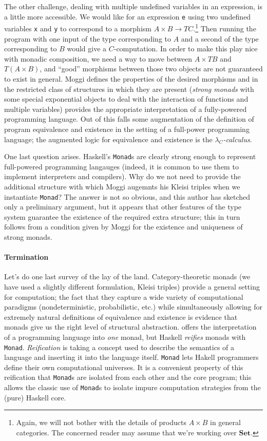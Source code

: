 \documentclass{article}
\renewcommand{\[}{\begin{eqnarray*}}
\renewcommand{\]}{\end{eqnarray*}}
\theoremstyle{definition}
\begin{document}
The other challenge, dealing with multiple undefined variables in an expression,
is a little more accessible. We would like for an expression \texttt{e} using
two undefined variables \texttt{x} and \texttt{y} to correspond to a morphism $A
\times B \rightarrow TC.$\footnote{Again, we will not bother with the details of
products $A \times B$ in general categories. The concerned reader may assume
that we're working over $\mathbf{Set}$.} Then running the program with one input
of the type corresponding to $A$ and a second of the type corresponding to $B$
would give a $C$-computation. In order to make this play nice with monadic
composition, we need a way to move between $A \times TB$ and $T(A \times B)$,
and ``good'' morphisms between those two objects are not guaranteed to exist in
general. Moggi defines the properties of the desired morphisms and in the
restricted class of structures in which they are present (\emph{strong monads}
with some special exponential objects to deal with the interaction of functions
and multiple variables) provides the appropriate interpretation of a
fully-powered programming language.  Out of this falls some augmentation of the
definition of program equivalence and existence in the setting of a full-power
programming language; the augmented logic for equivalence and existence is the
\emph{$\lambda_C$-calculus}.

One last question arises. Haskell's \texttt{Monad}s are clearly strong enough to
represent full-powered programming langauges (indeed, it is common to use them
to implement interpreters and compilers). Why do we not need to provide the
additional structure with which Moggi augemnts his Kleisi triples when we
instantiate \texttt{Monad}? The answer is not so obvious,
and this author has sketched only a preliminary argument, but it appears that
other features of the type system guarantee the existence of the required extra
structure; this in turn follows from a condition given by Moggi for the
existence and uniqueness of strong monads.

\paragraph{Termination} Let's do one last survey of the lay of the land.
Category-theoretic monads (we have used a slightly different formulation, Kleisi
triples) provide a general setting for computation; the fact that they capture a
wide variety of computational paradigms (nondeterministic, probabilistic, etc.)
while simultaneously allowing for extremely natural definitions of equivalence
and existence is evidence that monads give us the right level of structural
abstraction. \cite{moggi89} offers the interpretation of a programming language
into \emph{one} monad, but Haskell \emph{reifies} monads with \texttt{Monad}.
\emph{Reification} is taking a concept used to describe the semantics of a
language and inserting it into the language itself. \texttt{Monad} lets Hakell
programmers define their own computational universes.  It is a convenient
property of this reification that \texttt{Monad}s are isolated from each other
and the core program; this allows the classic use of \texttt{Monad}s to isolate
impure computation strategies from the (pure) Haskell
core.



\end{document}
